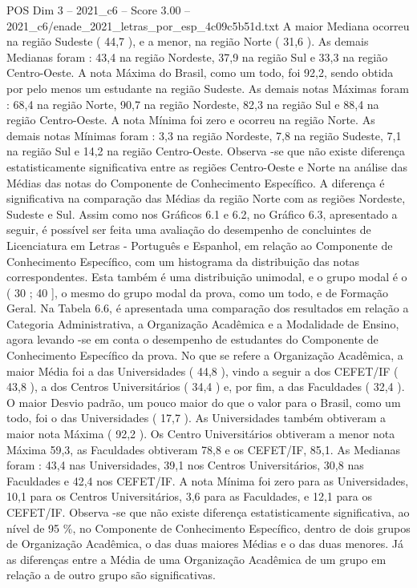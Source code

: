 \begin{textsample}{POS Dim 3 – 2021\_c6 – Score 3.00 – 2021\_c6/enade\_2021\_letras\_por\_esp\_4c09c5b51d.txt}
A maior Mediana ocorreu na região Sudeste ( 44,7 ), e a menor, na região Norte ( 31,6 ).
As demais Medianas foram : 43,4 na região Nordeste, 37,9 na região Sul e 33,3 na região Centro-Oeste.
A nota Máxima do Brasil, como um todo, foi 92,2, sendo obtida por pelo menos um estudante na região Sudeste.
As demais notas Máximas foram : 68,4 na região Norte, 90,7 na região Nordeste, 82,3 na região Sul e 88,4 na região Centro-Oeste.
A nota Mínima foi zero e ocorreu na região Norte.
As demais notas Mínimas foram : 3,3 na região Nordeste, 7,8 na região Sudeste, 7,1 na região Sul e 14,2 na região Centro-Oeste.
Observa -se que não existe diferença estatisticamente significativa entre as regiões Centro-Oeste e Norte na análise das Médias das notas do Componente de Conhecimento Específico.
A diferença é significativa na comparação das Médias da região Norte com as regiões Nordeste, Sudeste e Sul.
Assim como nos Gráficos 6.1 e 6.2, no Gráfico 6.3, apresentado a seguir, é possível ser feita uma avaliação do desempenho de concluintes de Licenciatura em Letras - Português e Espanhol, em relação ao Componente de Conhecimento Específico, com um histograma da distribuição das notas correspondentes.
Esta também é uma distribuição unimodal, e o grupo modal é o ( 30 ; 40 ], o mesmo do grupo modal da prova, como um todo, e de Formação Geral.
Na Tabela 6.6, é apresentada uma comparação dos resultados em relação a Categoria Administrativa, a Organização Acadêmica e a Modalidade de Ensino, agora levando -se em conta o desempenho de estudantes do Componente de Conhecimento Específico da prova.
No que se refere a Organização Acadêmica, a maior Média foi a das Universidades ( 44,8 ), vindo a seguir a dos CEFET/IF ( 43,8 ), a dos Centros Universitários ( 34,4 ) e, por fim, a das Faculdades ( 32,4 ).
O maior Desvio padrão, um pouco maior do que o valor para o Brasil, como um todo, foi o das Universidades ( 17,7 ).
As Universidades também obtiveram a maior nota Máxima ( 92,2 ).
Os Centro Universitários obtiveram a menor nota Máxima 59,3, as Faculdades obtiveram 78,8 e os CEFET/IF, 85,1.
As Medianas foram : 43,4 nas Universidades, 39,1 nos Centros Universitários, 30,8 nas Faculdades e 42,4 nos CEFET/IF.
A nota Mínima foi zero para as Universidades, 10,1 para os Centros Universitários, 3,6 para as Faculdades, e 12,1 para os CEFET/IF.
Observa -se que não existe diferença estatisticamente significativa, ao nível de 95 \%, no Componente de Conhecimento Específico, dentro de dois grupos de Organização Acadêmica, o das duas maiores Médias e o das duas menores.
Já as diferenças entre a Média de uma Organização Acadêmica de um grupo em relação a de outro grupo são significativas.

\end{textsample}
